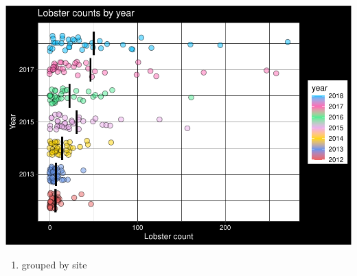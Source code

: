\documentclass[
]{article}
\providecommand{\tightlist}{%
  \setlength{\itemsep}{0pt}\setlength{\parskip}{0pt}}
\begin{document}
\includegraphics{hw1-lobstrs-eds241_files/figure-latex/unnamed-chunk-9-1.pdf}

\begin{enumerate}
\def\labelenumi{\arabic{enumi})}
\setcounter{enumi}{2}
\tightlist
\item
  grouped by site
\end{enumerate}
\end{document}
